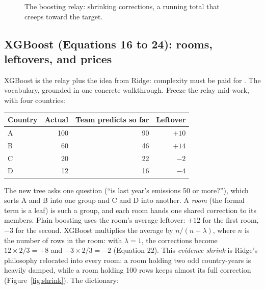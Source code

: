 \documentclass[11pt]{article}
\begin{document}
\begin{figure}[ht]
\centering
{}
\caption{The boosting relay: shrinking corrections, a running total that
creeps toward the target.}
\label{fig:relay}
\end{figure}

\subsection{XGBoost (Equations 16 to 24): rooms, leftovers, and prices}

XGBoost is the relay plus the idea from Ridge: complexity must be paid
for \cite{chen2016xgboost}. The vocabulary, grounded in one concrete
walkthrough. Freeze the relay mid-work, with four countries:

\begin{center}
\begin{tabular}{lrrr}
\toprule
Country & Actual & Team predicts so far & Leftover \\
\midrule
A & 100 & 90 & $+10$ \\
B & 60  & 46 & $+14$ \\
C & 20  & 22 & $-2$ \\
D & 12  & 16 & $-4$ \\
\bottomrule
\end{tabular}
\end{center}

The new tree asks one question (``is last year's emissions 50 or
more?''), which sorts A and B into one group and C and D into another. A
\emph{room} (the formal term is a leaf) is such a group, and each room
hands one shared correction to its members. Plain boosting uses the
room's average leftover: $+12$ for the first room, $-3$ for the second.
XGBoost multiplies the average by $n/(n+\lambda)$, where $n$ is the
number of rows in the room: with $\lambda = 1$, the corrections become
$12 \times 2/3 = +8$ and $-3 \times 2/3 = -2$ (Equation 22). This
\emph{evidence shrink} is Ridge's philosophy relocated into every room:
a room holding two odd country-years is heavily damped, while a room
holding 100 rows keeps almost its full correction
(Figure~\ref{fig:shrink}). The dictionary:
\end{document}
